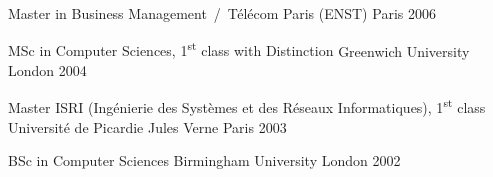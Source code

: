 


\begin{cventries}

  \cventry
    {Master in Business Management} %
    {\,/\, Télécom Paris (ENST)} %
    {Paris} %
    {2006} %
    {}
    {}

  \cventry
    {MSc in Computer Sciences, 1\textsuperscript{st} class with Distinction} %
    {\hspace{0.5em}Greenwich University} %
    {London} %
    {2004} %
    {}
    {}

  \cventry
    {Master ISRI (Ingénierie des Systèmes et des Réseaux Informatiques), 1\textsuperscript{st} class} %
    {\hspace{0.5em}Université de Picardie Jules Verne} %
    {Paris} %
    {2003} %
    {}
    {}

  \cventry
    {BSc in Computer Sciences} %
    {\hspace{0.5em}Birmingham University} %
    {London} %
    {2002} %
    {}
    {}
\end{cventries}
